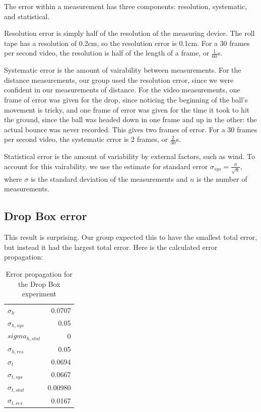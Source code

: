 \documentclass[12pt]{article}
\begin{document}
The error within a measurement has three components: resolution, systematic, and statistical.

Resolution error is simply half of the resolution of the measuring device. The roll tape has a resolution of 0.2cm, so the resolution error is 0.1cm. For a 30 frames per second video, the resolution is half of the length of a frame, or \(\frac{1}{60}\)s.

Systematic error is the amount of vairability between measurements. For the distance measurements, our group used the resolution error, since we were confident in our measurements of distance. For the video measurements, one frame of error was given for the drop, since noticing the beginning of the ball's movement is tricky, and one frame of error was given for the time it took to hit the ground, since the ball was headed down in one frame and up in the other: the actual bounce was never recorded. This gives two frames of error. For a 30 frames per second video, the systematic error is 2 frames, or \(\frac{2}{30}\)s.

Statistical error is the amount of variability by external factors, such as wind. To account for this vairability, we use the estimate for standard error \(\sigma_{sys} = \frac{\sigma}{\sqrt{n}}\), where \(\sigma\) is the standard deviation of the measurements and \(n\) is the number of measurements.
\subsection{Drop Box error}
\label{sec:orgaa09350}

This result is surprising. Our group expected this to have the smallest total error, but instead it had the largest total error. Here is the calculated error propagation:

\begin{table}[htbp]
\caption{\label{table:dropbox-error}Error propagation for the Drop Box experiment}
\centering
\begin{tabular}{lr}
\(\sigma_h\) & 0.0707\\
\(\sigma_{h,sys}\) & 0.05\\
\(sigma_{h,stat}\) & 0\\
\(\sigma_{h,res}\) & 0.05\\
\(\sigma_t\) & 0.0694\\
\(\sigma_{t,sys}\) & 0.0667\\
\(\sigma_{t,stat}\) & 0.00980\\
\(\sigma_{t,res}\) & 0.0167\\
\end{tabular}
\end{table}
\end{document}
